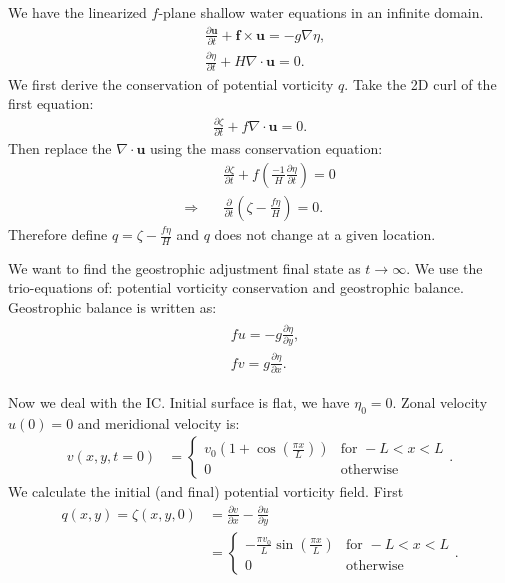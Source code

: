 \documentclass[11pt,letterpaper]{book}
\theoremstyle{definition}
\newcommand{\pe}{\partial}
\newcommand{\dsp}{\displaystyle}
\newcommand{\ve}[1]{\boldsymbol{#1}}
\newcommand{\thus}{\Rightarrow \quad }
\begin{document}
\subsection{}
We have the linearized $f$-plane shallow water equations in an infinite domain. 
\begin{align*}
& \frac{\pe \ve u}{\pe t}+\ve f\times\ve u = -g\nabla \eta,\\
& \frac{\pe \eta}{\pe t}+H\nabla\cdot\ve u = 0.
\end{align*}
We first derive the conservation of potential vorticity $q$. Take the 2D curl of the first equation:
\begin{align*}
\frac{\pe \zeta}{\pe t}+f\nabla\cdot \ve u = 0.
\end{align*}
Then replace the $\nabla\cdot\ve u$ using the mass conservation equation:
\begin{align*}
&\frac{\pe \zeta}{\pe t}+f\left( \frac{-1}{H}\frac{\pe \eta}{\pe t} \right) = 0\\
\thus&\frac{\pe}{\pe t}\left(\zeta-\frac{f\eta}{H}\right) = 0.
\end{align*}
Therefore define $\dsp{q = \zeta-\frac{f\eta}{H}}$ and $q$ does not change at a given location.

We want to find the geostrophic adjustment final state as $t\to \infty$. We use the trio-equations of: potential vorticity conservation and geostrophic balance. Geostrophic balance is written as:
\begin{align}
\begin{split}
&fu = -g\frac{\pe \eta}{\pe y},\\
&fv = g\frac{\pe \eta}{\pe x}.\label{geo_balance}
\end{split}
\end{align}

Now we deal with the IC. Initial surface is flat, we have $\eta_0 = 0$. Zonal velocity $u(0) = 0$ and meridional velocity is:
\begin{align*}
v(x,y,t = 0) &= \begin{cases}
v_0\left(1+\cos\left(\frac{\pi x}{L}\right)\right) & \text{for }-L<x<L\\
0&\text{otherwise}
\end{cases}.
\end{align*}
We calculate the initial (and final) potential vorticity field. First
\begin{align*}
q(x,y)=\zeta(x,y,0) &= \frac{\pe v}{\pe x}-\frac{\pe u}{\pe y}\\
&= \begin{cases}
-\frac{\pi v_0}{L}\sin\left(\frac{\pi x}{L}\right) &\text{for }-L<x<L\\
0 &\text{otherwise}
\end{cases}.
\end{align*}
\end{document}
